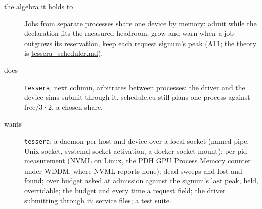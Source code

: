 \begin{description}
\item[{the algebra it holds to}] Jobs from separate processes share one device by memory: admit while the declaration fits the measured headroom, grow and warn when a job outgrows its reservation, keep each request signum's peak (A11; the theory is \hyperref[chap:tessera-scheduler]{tessera\_\allowbreak{}scheduler.md}).
\item[{does}] \texttt{tessera}, next column, arbitrates between processes: the driver and the device sims submit through it. schedule.cu still plans one process against free/3·2, a chosen share.
\item[{wants}] \texttt{tessera}: a daemon per host and device over a local socket (named pipe, Unix socket, systemd socket activation, a docker socket mount); per-pid measurement (NVML on Linux, the PDH GPU Process Memory counter under WDDM, where NVML reports none); dead sweeps and lost and found; over budget asked at admission against the signum's last peak, held, overridable; the budget and every time a request field; the driver submitting through it; service files; a test suite.

\end{description}
